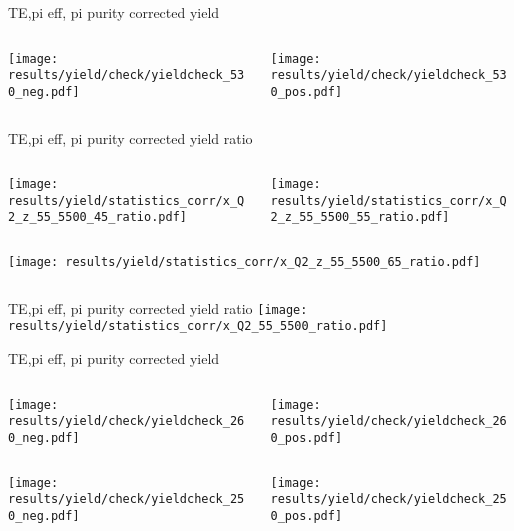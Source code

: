 \begin{frame}{TE,pi eff, pi purity corrected yield}
\begin{columns}
\begin{column}[T]{0.5\textwidth}
\texttt{[image: results/yield/check/yieldcheck\_530\_neg.pdf]}
\end{column}
\begin{column}[T]{0.5\textwidth}
\texttt{[image: results/yield/check/yieldcheck\_530\_pos.pdf]}
\end{column}
\end{columns}
\end{frame}
\begin{frame}{TE,pi eff, pi purity corrected yield ratio}
\begin{columns}
\begin{column}[T]{0.5\textwidth}
\texttt{[image: results/yield/statistics\_corr/x\_Q2\_z\_55\_5500\_45\_ratio.pdf]}
\end{column}
\begin{column}[T]{0.5\textwidth}
\texttt{[image: results/yield/statistics\_corr/x\_Q2\_z\_55\_5500\_55\_ratio.pdf]}
\end{column}
\end{columns}
\begin{columns}
\begin{column}[T]{0.5\textwidth}
\texttt{[image: results/yield/statistics\_corr/x\_Q2\_z\_55\_5500\_65\_ratio.pdf]}
\end{column}
\begin{column}[T]{0.5\textwidth}
\end{column}
\end{columns}
\end{frame}
\begin{frame}{TE,pi eff, pi purity corrected yield ratio}
\texttt{[image: results/yield/statistics\_corr/x\_Q2\_55\_5500\_ratio.pdf]}
\end{frame}
\begin{frame}{TE,pi eff, pi purity corrected yield}
\begin{columns}
\begin{column}[T]{0.5\textwidth}
\texttt{[image: results/yield/check/yieldcheck\_260\_neg.pdf]}
\end{column}
\begin{column}[T]{0.5\textwidth}
\texttt{[image: results/yield/check/yieldcheck\_260\_pos.pdf]}
\end{column}
\end{columns}
\begin{columns}
\begin{column}[T]{0.5\textwidth}
\texttt{[image: results/yield/check/yieldcheck\_250\_neg.pdf]}
\end{column}
\begin{column}[T]{0.5\textwidth}
\texttt{[image: results/yield/check/yieldcheck\_250\_pos.pdf]}
\end{column}
\end{columns}
\end{frame}
